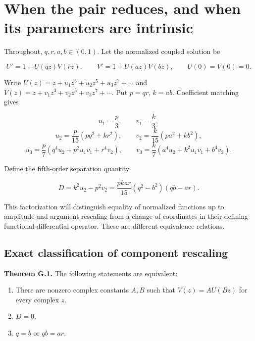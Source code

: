\hypertarget{v11-coupled_inverse_full-when-the-pair-reduces-and-when-its-parameters-are-intrinsic}{%
\chapter[Reduction and intrinsic parameters]{When the pair reduces, and when its parameters are
intrinsic}\label{app:coupled-inverse}\label{v11-coupled_inverse_full-when-the-pair-reduces-and-when-its-parameters-are-intrinsic}}

Throughout, \(q,r,a,b\in(0,1)\). Let the normalized coupled solution be

\[
U'=1+U(qz)V(rz),\qquad V'=1+U(az)V(bz),\qquad U(0)=V(0)=0.
\]

Write \(U(z)=z+u_1z^3+u_2z^5+u_3z^7+\cdots\) and
\(V(z)=z+v_1z^3+v_2z^5+v_3z^7+\cdots\). Put \(p=qr\), \(k=ab\).
Coefficient matching gives

\[
u_1=\frac p3,\qquad v_1=\frac k3,
\] \[
u_2=\frac p{15}(p q^2+k r^2),\qquad
v_2=\frac k{15}(p a^2+k b^2),
\] \[
u_3=\frac p7(q^4u_2+p^2u_1v_1+r^4v_2),\qquad
v_3=\frac k7(a^4u_2+k^2u_1v_1+b^4v_2).
\]

Define the fifth-order separation quantity

\[
\boxed{D=k^2u_2-p^2v_2
=\frac{pk ar}{15}(q^2-b^2)(qb-ar).}
\]

This factorization will distinguish equality of normalized functions up
to amplitude and argument rescaling from a change of coordinates in
their defining functional differential operator. These are different
equivalence relations.

\hypertarget{v11-coupled_inverse_full-exact-classification-of-component-rescaling}{%
\section{Exact classification of component
rescaling}\label{v11-coupled_inverse_full-exact-classification-of-component-rescaling}}

\textbf{Theorem G.1.} The following statements are equivalent:

\begin{enumerate}
\def\labelenumi{\arabic{enumi}.}
\tightlist
\item
  There are nonzero complex constants \(A,B\) such that \(V(z)=A U(Bz)\)
  for every complex \(z\).
\item
  \(D=0\).
\item
  \(q=b\) or \(qb=ar\).
\end{enumerate}

